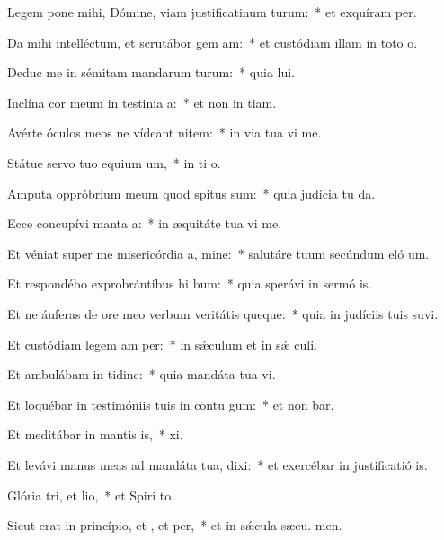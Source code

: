 \item Legem pone mihi, Dómine, viam justificatinum turum:~* et exquíram  per.
\item Da mihi intelléctum, et scrutábor gem am:~* et custódiam illam in toto  o.
\item Deduc me in sémitam mandarum turum:~* quia  lui.
\item Inclína cor meum in testinia a:~* et non in tiam.
\item Avérte óculos meos ne vídeant nitem:~* in via tua vi me.
\item Státue servo tuo equium um,~* in ti o.
\item Amputa oppróbrium meum quod spitus sum:~* quia judícia tu da.
\item Ecce concupívi manta a:~* in æquitáte tua vi me.
\item Et véniat super me misericórdia a, mine:~* salutáre tuum secúndum eló um.
\item Et respondébo exprobrántibus hi bum:~* quia sperávi in sermó is.
\item Et ne áuferas de ore meo verbum veritátis queque:~* quia in judíciis tuis suvi.
\item Et custódiam legem am per:~* in sǽculum et in sǽ culi.
\item Et ambulábam in tidine:~* quia mandáta tua vi.
\item Et loquébar in testimóniis tuis in contu gum:~* et non bar.
\item Et meditábar in mantis is,~*  xi.
\item Et levávi manus meas ad mandáta tua,  dixi:~* et exercébar in justificatió is.
\item Glória tri, et lio,~* et Spirí to.
\item Sicut erat in princípio, et , et per,~* et in sǽcula sæcu. men.
